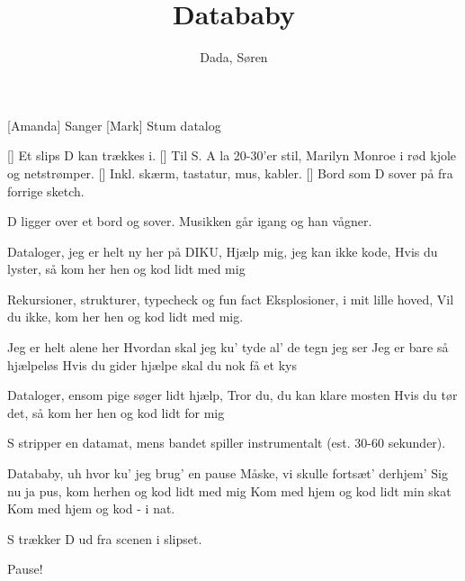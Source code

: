 \documentclass[a4paper,11pt]{article}
\title{Datababy}
\author{Dada, Søren}
\begin{document}
\maketitle

\begin{roles}  
[Amanda] Sanger
[Mark] Stum datalog
\end{roles}

\begin{props}
	 Et slips D kan trækkes i.
	 Til S. A la 20-30'er stil, Marilyn Monroe i rød kjole og netstrømper.
	 Inkl. skærm, tastatur, mus, kabler.
	 Bord som D sover på fra forrige sketch.
\end{props}

\scene D ligger over et bord og sover. Musikken går igang og han vågner.

\begin{song}
   Dataloger, jeg er helt ny her på DIKU,
Hjælp mig, jeg kan ikke kode,
Hvis du lyster, så kom her hen og kod lidt med mig

   Rekursioner, strukturer, typecheck og fun fact
  Eksplosioner, i mit lille hoved,
  Vil du ikke, kom her hen og kod lidt med mig.

   Jeg er helt alene her
  Hvordan skal jeg ku' tyde al' de tegn jeg ser
  Jeg er bare så hjælpeløs
  Hvis du gider hjælpe skal du nok få et kys

   Dataloger, ensom pige søger lidt hjælp,
  Tror du, du kan klare mosten
  Hvis du tør det, så kom her hen og kod lidt for mig

  \scene S stripper en datamat, mens bandet spiller instrumentalt (est. 30-60 sekunder).

   Datababy, uh hvor ku' jeg brug' en pause
  Måske, vi skulle fortsæt' derhjem'
  Sig nu ja pus, kom herhen og kod lidt med mig
  Kom med hjem og kod lidt min skat
  Kom med hjem og kod - i nat.

  \scene S trækker D ud fra scenen i slipset.

   Pause!
\end{song}
\end{document}
